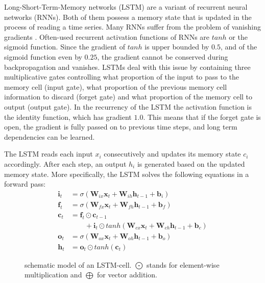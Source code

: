 \documentclass[11pt,a4paper]{article}
\begin{document}
Long-Short-Term-Memory networks (LSTM) \cite{hochreiter1997long} are a variant of recurrent neural networks (RNNs). Both of them possess a memory state that is updated in the process of reading a time series. Many RNNs suffer from the problem of vanishing gradients \cite{hochreiter1997long}. Often-used recurrent activation functions of RNNs are $tanh$ or the sigmoid function. Since the gradient of $tanh$ is upper bounded by $0.5$, and of the sigmoid function even by $0.25$, the gradient cannot be conserved during backpropagation and vanishes. LSTMs deal with this issue by containing three multiplicative gates controlling what proportion of the input to pass to the memory cell (input gate), what proportion of the previous memory cell information to discard (forget gate) and what proportion of the memory cell to output (output gate). In the recurrency of the LSTM the activation function is the identity function, which has gradient $1.0$. This means that if the forget gate is open, the gradient is fully passed on to previous time steps, and long term dependencies can be learned.

The LSTM reads each input $x_i$ consecutively and updates its memory state $c_i$ accordingly. After each step, an output $h_i$ is generated based on the updated memory state. More specifically, the LSTM solves the following equations in a forward pass:
%
\begin{equation}
\begin{split}
    \mathbf{i}_t &= \sigma(\mathbf{W}_{ix}\mathbf{x}_t+\mathbf{W}_{ih}\mathbf{h}_{t-1}+\mathbf{b}_i) \\
    \mathbf{f}_t &= \sigma(\mathbf{W}_{fx}\mathbf{x}_t+\mathbf{W}_{fh}\mathbf{h}_{t-1}+\mathbf{b}_f) \\
    \mathbf{c}_t &= \mathbf{f}_t \odot \mathbf{c}_{t-1}\\
    & \qquad +\mathbf{i}_t \odot tanh(\mathbf{W}_{cx}\mathbf{x}_t + \mathbf{W}_{ch}\mathbf{h}_{t-1}+\mathbf{b}_c) \\
    \mathbf{o}_t &= \sigma(\mathbf{W}_{ox}\mathbf{x}_t + \mathbf{W}_{oh}\mathbf{h}_{t-1} + \mathbf{b}_o)\\
    \mathbf{h}_t &= \mathbf{o}_t \odot tanh(\mathbf{c}_t) 
    \label{eq:lstm_equations}
\end{split}
\end{equation}

\begin{figure}[h]
    \centering
    
    \caption{schematic model of an LSTM-cell. $\bigodot$ stands for element-wise multiplication and $\bigoplus$ for vector addition.}
    \label{fig:lstm_cell}

\end{figure}
%
\end{document}
